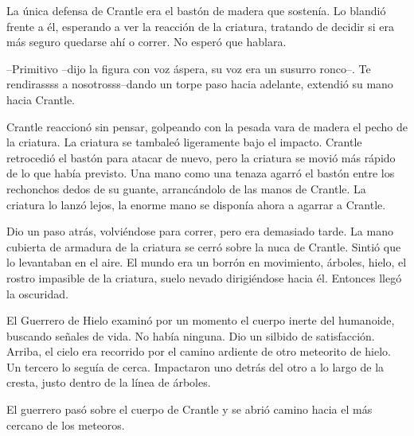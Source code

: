 La única defensa de Crantle era el bastón de madera que sostenía. Lo blandió frente a él, esperando a ver la reacción de la criatura, tratando de decidir si era más seguro quedarse ahí o correr. No esperó que hablara.



--Primitivo --dijo la figura con voz áspera, su voz era un susurro ronco--. Te rendirassss a nosotrosss--dando un torpe paso hacia adelante, extendió su mano hacia Crantle.



Crantle reaccionó sin pensar, golpeando con la pesada vara de madera el pecho de la criatura. La criatura se tambaleó ligeramente bajo el impacto. Crantle retrocedió el bastón para atacar de nuevo, pero la criatura se movió más rápido de lo que había previsto. Una mano como una tenaza agarró el bastón entre los rechonchos dedos de su guante, arrancándolo de las manos de Crantle. La criatura lo lanzó lejos, la enorme mano se disponía ahora a agarrar a Crantle.



Dio un paso atrás, volviéndose para correr, pero era demasiado tarde. La mano cubierta de armadura de la criatura se cerró sobre la nuca de Crantle. Sintió que lo levantaban en el aire. El mundo era un borrón en movimiento, árboles, hielo, el rostro impasible de la criatura, suelo nevado dirigiéndose hacia él. Entonces llegó la oscuridad.



\mbox{}



El Guerrero de Hielo examinó por un momento el cuerpo inerte del humanoide, buscando señales de vida. No había ninguna. Dio un silbido de satisfacción. Arriba, el cielo era recorrido por el camino ardiente de otro meteorito de hielo. Un tercero lo seguía de cerca. Impactaron uno detrás del otro a lo largo de la cresta, justo dentro de la línea de árboles.



El guerrero pasó sobre el cuerpo de Crantle y se abrió camino hacia el más cercano de los meteoros.

